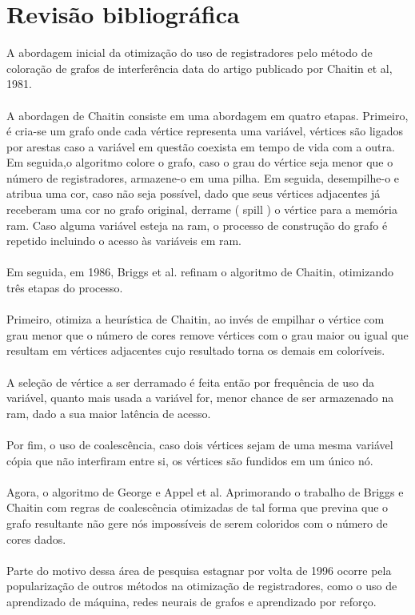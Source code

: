 \section{Revisão bibliográfica}
A abordagem inicial da otimização do uso de registradores pelo método de coloração de grafos de interferência data do artigo publicado por Chaitin et al, 1981.
\\
\\
A abordagen de Chaitin consiste em uma abordagem em quatro etapas. Primeiro, é cria-se um grafo onde cada vértice representa uma variável, vértices são ligados por arestas caso a variável em questão coexista em tempo de vida com a outra. Em seguida,o algoritmo colore o grafo, caso o grau do vértice seja menor que o número de registradores, armazene-o em uma pilha. Em seguida, desempilhe-o e atribua uma cor, caso não seja possível, dado que seus vértices adjacentes já receberam uma cor no grafo original, derrame ( spill ) o vértice para a memória ram. Caso alguma variável esteja na ram, o processo de construção do grafo é repetido incluindo o acesso às variáveis em ram.
\\
\\
Em seguida, em 1986, Briggs et al. refinam o algoritmo de Chaitin, otimizando três etapas do processo.
\\
\\
Primeiro, otimiza a heurística de Chaitin, ao invés de empilhar o vértice com grau menor que o número de cores remove vértices com o grau maior ou igual que resultam em vértices adjacentes cujo resultado torna os demais em coloríveis.
\\
\\
A seleção de vértice a ser derramado é feita então por frequência de uso da variável, quanto mais usada a variável for, menor chance de ser armazenado na ram, dado a sua maior latência de acesso.
\\
\\
Por fim, o uso de coalescência, caso dois vértices sejam de uma mesma variável cópia que não interfiram entre si, os vértices são fundidos em um único nó.
\\
\\
Agora, o algoritmo de George e Appel et al. Aprimorando o trabalho de Briggs e Chaitin com regras de coalescência otimizadas de tal forma que previna que o grafo resultante não gere nós impossíveis de serem coloridos com o número de cores dados.
\\
\\
Parte do motivo dessa área de pesquisa estagnar por volta de 1996 ocorre pela popularização de outros métodos na otimização de registradores, como o uso de aprendizado de máquina, redes neurais de grafos e aprendizado por reforço.